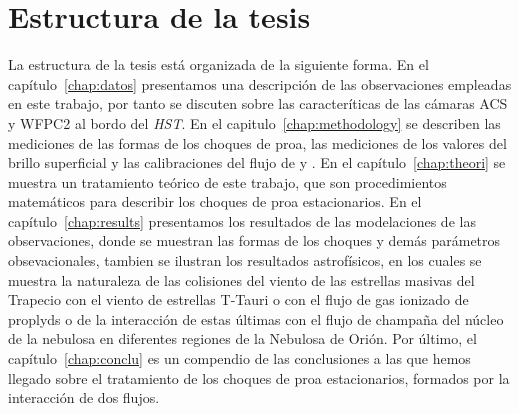 \section{Estructura de la tesis}
\label{sec:estructura}

La estructura de la tesis está organizada de la siguiente forma. En el capítulo~\ref{chap:datos} presentamos una descripción de las observaciones empleadas en este trabajo, por tanto se discuten sobre las caracteríticas de las cámaras ACS y WFPC2 al bordo del \textit{HST}. En el capitulo~\ref{chap:methodology} se describen las mediciones de las formas de los choques de proa, las mediciones de los valores del brillo superficial y las calibraciones del flujo de \ha{} y \nii{}. En el capítulo~\ref{chap:theori} se muestra un tratamiento teórico de este trabajo, que son procedimientos matemáticos para describir los choques de proa estacionarios. En el capítulo~\ref{chap:results} presentamos los resultados de las modelaciones de las observaciones, donde se muestran las formas de los choques y demás parámetros obsevacionales, tambien se ilustran los resultados astrofísicos, en los cuales se muestra la naturaleza de las colisiones del viento de las estrellas masivas del Trapecio con el viento de estrellas T-Tauri o con el flujo de gas ionizado de  proplyds o de la interacción de estas últimas con el flujo de champaña del núcleo de la nebulosa en diferentes regiones de la Nebulosa de Orión. Por último, el capítulo~\ref{chap:conclu} es un compendio de las conclusiones a las que hemos llegado sobre el tratamiento de los choques de proa estacionarios, formados por la interacción de dos flujos.   
% 

% 
